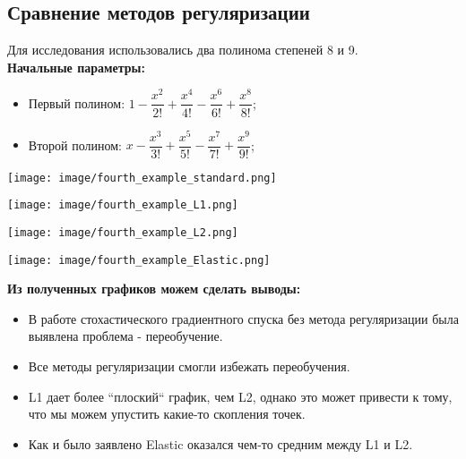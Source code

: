 \documentclass{article}
\begin{document}
\subsection*{Сравнение методов регуляризации}
Для исследования использовались два полинома степеней 8 и 9. \\

\noindent \textbf{Начальные параметры:}
\begin{itemize}
    \item Первый полином: $1 - \dfrac{x^2}{2!} + \dfrac{x^4}{4!} - \dfrac{x^6}{6!} + \dfrac{x^8}{8!}$;
    \item Второй полином: $x - \dfrac{x^3}{3!} + \dfrac{x^5}{5!} - \dfrac{x^7}{7!} + \dfrac{x^9}{9!}$;
\end{itemize}

\begin{center}
    \texttt{[image: image/fourth\_example\_standard.png]}
    \label{fig:enter-label}
\end{center}
\begin{center}
    \texttt{[image: image/fourth\_example\_L1.png]}
    \label{fig:enter-label}
\end{center}
\begin{center}
    \texttt{[image: image/fourth\_example\_L2.png]}
    \label{fig:enter-label}
\end{center}
\begin{center}
    \texttt{[image: image/fourth\_example\_Elastic.png]}
    \label{fig:enter-label}
\end{center}

\quad

\noindent \textbf{Из полученных графиков можем сделать выводы:}
\begin{itemize}
    \item В работе стохастического градиентного спуска без метода регуляризации была выявлена проблема - переобучение.
    \item Все методы регуляризации смогли избежать переобучения. 
    \item L1 дает более ``плоский`` график, чем L2, однако это может привести к тому, что мы можем упустить какие-то скопления точек.
    \item Как и было заявлено Elastic оказался чем-то средним между L1 и L2.
\end{itemize}
\end{document}
